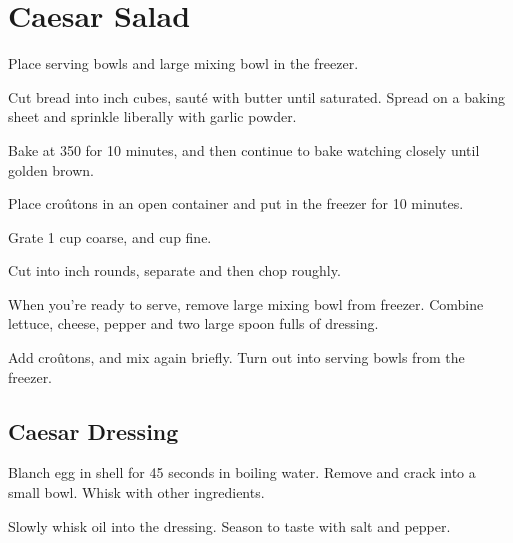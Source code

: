\section{Caesar Salad}
\begin{recipe}

Place serving bowls and large mixing bowl in the freezer.


Cut bread into  inch cubes, sauté  with butter until saturated. Spread on a baking sheet and sprinkle liberally with garlic powder.

Bake at 350\degree{} for 10 minutes, and then continue to bake watching closely until golden brown.

Place croûtons in an open container and put in the freezer for 10 minutes.


Grate 1 cup coarse, and  cup fine.


Cut into  inch rounds, separate and then chop roughly.


When you're ready to serve, remove large mixing bowl from freezer. Combine lettuce, cheese, pepper and two large spoon fulls of dressing.

Add croûtons, and mix again briefly. Turn out into serving bowls from the freezer.


\subsection{Caesar Dressing}


Blanch egg in shell for 45 seconds in boiling water. Remove and crack into a small bowl. Whisk with other ingredients.


Slowly whisk oil into the dressing. Season to taste with salt and pepper.

\end{recipe}
